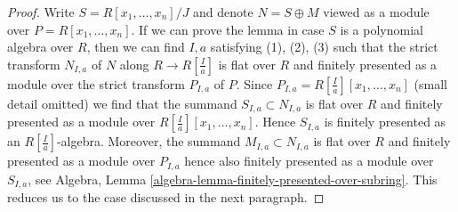 \documentclass[10pt,a4paper]{amsart}
\theoremstyle{plain}
\theoremstyle{definition}
\theoremstyle{remark}
\numberwithin{equation}{subsection}
\begin{document}
\begin{proof}
Write $S = R[x_1, \ldots, x_n]/J$ and denote $N = S \oplus M$
viewed as a module over $P = R[x_1, \ldots, x_n]$. If we can prove the
lemma in case $S$ is a polynomial algebra over $R$, then we can
find $I, a$ satisfying (1), (2), (3) such that the strict transform
$N_{I, a}$ of $N$ along $R \to R[\frac{I}{a}]$ is flat over
$R$ and finitely presented as a module over the strict transform $P_{I, a}$
of $P$. Since $P_{I, a} = R[\frac{I}{a}][x_1, \ldots, x_n]$
(small detail omitted)
we find that the summand $S_{I, a} \subset N_{I, a}$ is flat over $R$
and finitely presented as a module over $R[\frac{I}{a}][x_1, \ldots, x_n]$.
Hence $S_{I, a}$ is finitely presented as an $R[\frac{I}{a}]$-algebra.
Moreover, the summand $M_{I, a} \subset N_{I, a}$ is flat over $R$
and finitely presented as a module over $P_{I, a}$ hence also
finitely presented as a module over $S_{I, a}$, see
Algebra, Lemma \ref{algebra-lemma-finitely-presented-over-subring}.
This reduces us to the case discussed in the next paragraph.


\end{proof}
\end{document}
